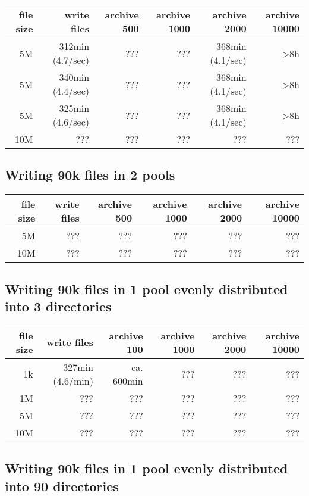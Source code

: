 \documentclass[a4paper,8pt]{scrartcl}
\begin{document}
\begin{tabular}{|r||r||r|r|r|r|}
  \hline
  file size & write files  & archive 500 & archive 1000 & archive 2000 & archive 10000 \\
  \hline
  5M        & 312min (4.7/sec) & ??? & ??? & 368min (4.1/sec) & >8h \\
  5M        & 340min (4.4/sec) & ??? & ??? & 368min (4.1/sec) & >8h \\
  5M        & 325min (4.6/sec) & ??? & ??? & 368min (4.1/sec) & >8h \\
  \hline
  10M       & ??? & ??? & ??? & ??? & ??? \\
  \hline
\end{tabular}

\subsection{Writing 90k files in 2 pools}

\begin{tabular}{|r||r||r|r|r|r|}
  \hline
  file size & write files  & archive 500 & archive 1000 & archive 2000 & archive 10000 \\
  \hline
  5M        & ??? & ??? & ??? & ??? & ??? \\
  \hline
  10M       & ??? & ??? & ??? & ??? & ??? \\
  \hline
\end{tabular}

\subsection{Writing 90k files in 1 pool evenly distributed into 3 directories}
\begin{tabular}{|r||r||r|r|r|r|}
  \hline
  file size & write files  & archive 100 & archive 1000 & archive 2000 & archive 10000 \\
  \hline
  1k        & 327min (4.6/min) & ca. 600min & ??? & ??? & ??? \\
  \hline
  1M        & ??? & ??? & ??? & ??? & ??? \\
  \hline
  5M        & ??? & ??? & ??? & ??? & ??? \\
  \hline
  10M       & ??? & ??? & ??? & ??? & ??? \\
  \hline
\end{tabular}

\subsection{Writing 90k files in 1 pool evenly distributed into 90 directories}
\end{document}
